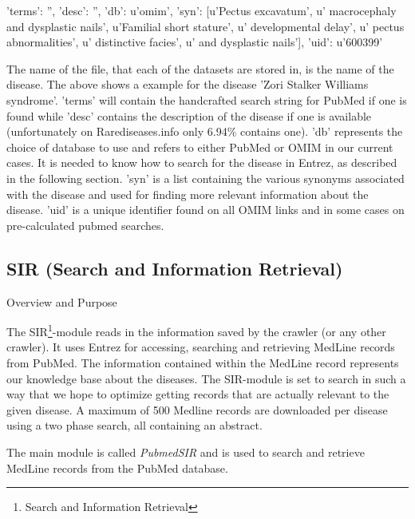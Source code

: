 {'terms': '', 'desc': '', 'db': u'omim', 'syn': [u'Pectus excavatum', u' macrocephaly and dysplastic nails', u'Familial short stature', u' developmental delay', u' pectus abnormalities', u' distinctive facies', u' and dysplastic nails'], 'uid': u'600399'}

The name of the file, that each of the datasets are stored in, is the name of the disease. The above shows a example for the disease 'Zori Stalker Williams syndrome'. 'terms' will contain the handcrafted search string for PubMed if one is found while 'desc' contains the description of the disease if one is available (unfortunately on Rarediseases.info only 6.94\% contains one). 'db' represents the choice of database to use and refers to either PubMed or OMIM in our current cases. It is needed to know how to search for the disease in Entrez, as described in the following section. 'syn' is a list containing the various synonyms associated with the disease and used for finding more relevant information about the disease. 'uid' is a unique identifier found on all OMIM links and in some cases on pre-calculated pubmed searches.

\subsection{SIR (Search and Information Retrieval)\label{SIR}}

Overview and Purpose

The SIR\footnote{Search and Information Retrieval}-module reads in the information saved by the crawler (or any other crawler). It uses Entrez for accessing, searching and retrieving MedLine records from PubMed. The information contained within the MedLine record represents our knowledge base about the diseases. The SIR-module is set to search in such a way that we hope to optimize getting records that are actually relevant to the given disease. A maximum of 500 Medline records are downloaded per disease using a two phase search, all containing an abstract.

The main module is called \textit{PubmedSIR} and is used to search and retrieve MedLine records from the PubMed database.

